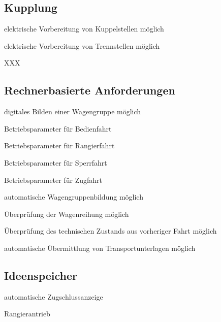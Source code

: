 \subsection{Kupplung}
\begin{feat}[REQ. 14]
elektrische Vorbereitung von Kuppelstellen möglich
\end{feat}
\begin{feat}
elektrische Vorbereitung von Trennstellen möglich
\end{feat}
\begin{rem}
XXX
\end{rem}

\subsection{Rechnerbasierte Anforderungen}
\begin{feat}
digitales Bilden einer Wagengruppe möglich
\end{feat}
\begin{feat}
Betriebsparameter für Bedienfahrt
\end{feat}
\begin{feat}
Betriebsparameter für Rangierfahrt
\end{feat}
\begin{feat}
Betriebsparameter für Sperrfahrt
\end{feat}
\begin{feat}
Betriebsparameter für Zugfahrt	
\end{feat}
\begin{feat}
automatische Wagengruppenbildung möglich
\end{feat}
\begin{feat}
Überprüfung der Wagenreihung möglich
\end{feat}
\begin{feat}
Überprüfung des technischen Zustands aus vorheriger Fahrt möglich
\end{feat}
\begin{feat}
automatische Übermittlung von Transportunterlagen möglich
\end{feat}

\subsection{Ideenspeicher}
\begin{feat}
automatische Zugschlussanzeige
\end{feat}
\begin{feat}
Rangierantrieb
\end{feat}